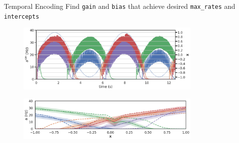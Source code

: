 \documentclass[aspectratio=169]{beamer}
\begin{document}
\begin{frame}[fragile]{Temporal Encoding}
	Find \texttt{gain} and \texttt{bias} that achieve desired \texttt{max\_rates} and \texttt{intercepts}
	\begin{figure}
	    \centering
	    \includegraphics[width=0.8\textwidth]{media/atxt5.png}
	\end{figure}
	\vspace{-0.5cm}
	\begin{figure}
	    \centering
	    \includegraphics[width=0.8\textwidth]{media/tc1_wide2.png}
	\end{figure}
\end{frame}
\end{document}
